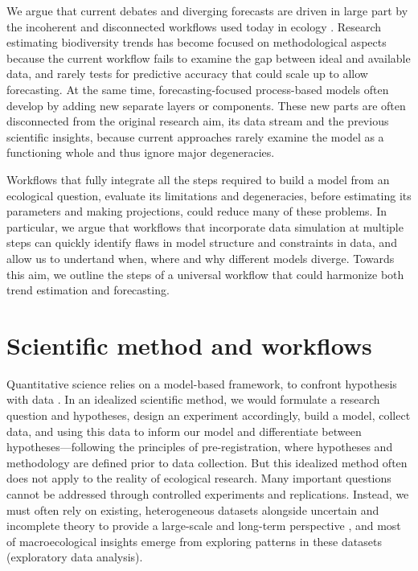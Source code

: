 \documentclass[11pt]{article}
\begin{document}
We argue that current debates and diverging forecasts are driven in large part by the incoherent and disconnected workflows used today in ecology \citep{Loreau2022, Talis2023, Johnson2024}. Research estimating biodiversity trends has become focused on methodological aspects because the current workflow fails to examine the gap between ideal and available data, and rarely tests for predictive accuracy that could scale up to allow forecasting. At the same time, forecasting-focused process-based models often develop by adding new separate layers or components. These new parts are often disconnected from the original research aim, its data stream and the previous scientific insights, because current approaches rarely examine the model as a functioning whole and thus ignore major degeneracies. 

Workflows that fully integrate all the steps required to build a model from an ecological question, evaluate its limitations and degeneracies, before estimating its parameters and making projections, could reduce many of these problems. In particular, we argue that workflows that incorporate data simulation at multiple steps can quickly identify flaws in model structure and constraints in data, and allow us to undertand when, where and why different models diverge. Towards this aim,  we outline the steps of a universal workflow that could harmonize both trend estimation and forecasting.

\section{Scientific method and workflows}

Quantitative science relies on a model-based framework, to confront hypothesis with data \citep{Chamberlin:1965cd}. In an idealized scientific method, we would formulate a research question and hypotheses, design an experiment accordingly, build a model, collect data, and using this data to inform our model and differentiate between hypotheses---following the principles of pre-registration, where hypotheses and methodology are defined prior to data collection.  %
But this idealized method often does not apply to the reality of ecological research. Many important questions cannot be addressed through controlled experiments and replications. Instead, we must often rely on existing, heterogeneous datasets alongside uncertain and incomplete theory to provide a large-scale and long-term perspective \citep{Hilborn1997}, and most of macroecological insights emerge from exploring patterns in these datasets (exploratory data analysis).
\end{document}
